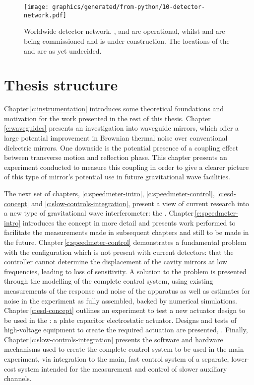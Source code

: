 \begin{figure}
  \centering
  \texttt{[image: graphics/generated/from-python/10-detector-network.pdf]}
  \caption[Worldwide detector network]{Worldwide detector network. \GEO{}, \LHO{} and \LLO{} are operational, whilst \VIRGO{} and \KAGRA{} are being commissioned and \INDIGO{} is under construction. The locations of the \ET{} and \LIGOCE{} are as yet undecided.}
\end{figure}

\section{Thesis structure}
Chapter\,\ref{c:instrumentation} introduces some theoretical foundations and motivation for the work presented in the rest of this thesis. Chapter\,\ref{c:waveguides} presents an investigation into waveguide mirrors, which offer a large potential improvement in Brownian thermal noise over conventional dielectric mirrors. One downside is the potential presence of a coupling effect between transverse motion and reflection phase. This chapter presents an experiment conducted to measure this coupling in order to give a clearer picture of this type of mirror's potential use in future gravitational wave facilities.

The next set of chapters, \ref{c:speedmeter-intro}, \ref{c:speedmeter-control}, \ref{c:esd-concept} and \ref{c:slow-controls-integration}, present a view of current research into a new type of gravitational wave interferometer: the \SSM{}. Chapter\,\ref{c:speedmeter-intro} introduces the concept in more detail and presents work performed to facilitate the measurements made in subsequent chapters and still to be made in the future. Chapter\,\ref{c:speedmeter-control} demonstrates a fundamental problem with the \SSM{} configuration which is not present with current detectors: that the controller cannot determine the displacement of the cavity mirrors at low frequencies, leading to loss of sensitivity. A solution to the problem is presented through the modelling of the complete control system, using existing measurements of the response and noise of the apparatus as well as estimates for noise in the experiment as fully assembled, backed by numerical simulations. Chapter\,\ref{c:esd-concept} outlines an experiment to test a new actuator design to be used in the \SSMEXPT{}: a plate capacitor electrostatic actuator. Designs and tests of high-voltage equipment to create the required actuation are presented, . Finally, Chapter\,\ref{c:slow-controls-integration} presents the software and hardware mechanisms used to create the complete control system to be used in the main experiment, via integration to the main, fast control system of a separate, lower-cost system intended for the measurement and control of slower auxiliary channels.

